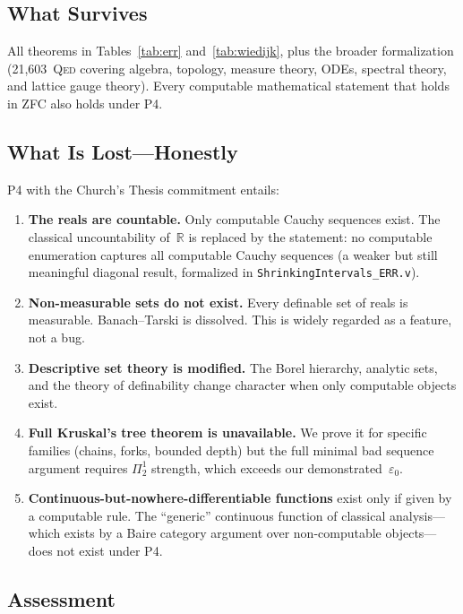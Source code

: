 \documentclass[11pt,a4paper]{article}
\theoremstyle{definition}
\theoremstyle{remark}
\newcommand{\Qed}{\textsc{Qed}}
\begin{document}
\subsection{What Survives}

All theorems in Tables~\ref{tab:err} and~\ref{tab:wiedijk}, plus the broader formalization (21,603~\Qed{} covering algebra, topology, measure theory, ODEs, spectral theory, and lattice gauge theory).  Every computable mathematical statement that holds in ZFC also holds under P4.

\subsection{What Is Lost---Honestly}

P4 with the Church's Thesis commitment entails:

\begin{enumerate}
\item \textbf{The reals are countable.}  Only computable Cauchy sequences exist.  The classical uncountability of~$\mathbb{R}$ is replaced by the statement: no computable enumeration captures all computable Cauchy sequences (a weaker but still meaningful diagonal result, formalized in \texttt{ShrinkingIntervals\_ERR.v}).

\item \textbf{Non-measurable sets do not exist.}  Every definable set of reals is measurable.  Banach--Tarski is dissolved.  This is widely regarded as a feature, not a bug.

\item \textbf{Descriptive set theory is modified.}  The Borel hierarchy, analytic sets, and the theory of definability change character when only computable objects exist.

\item \textbf{Full Kruskal's tree theorem is unavailable.}  We prove it for specific families (chains, forks, bounded depth) but the full minimal bad sequence argument requires $\Pi^1_2$ strength, which exceeds our demonstrated~$\varepsilon_0$.

\item \textbf{Continuous-but-nowhere-differentiable functions} exist only if given by a computable rule.  The ``generic'' continuous function of classical analysis---which exists by a Baire category argument over non-computable objects---does not exist under P4.
\end{enumerate}

\subsection{Assessment}
\end{document}

